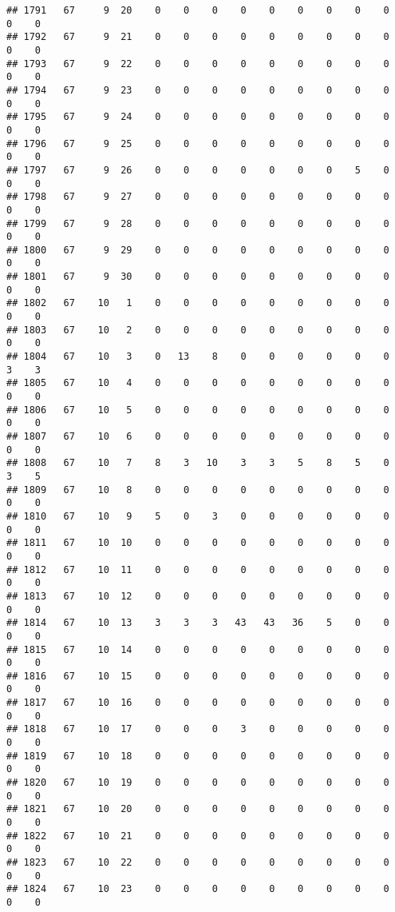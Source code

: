 \documentclass[]{article}
\begin{document}
\begin{verbatim}
## 1791   67     9  20    0    0    0    0    0    0    0    0    0    0    0
## 1792   67     9  21    0    0    0    0    0    0    0    0    0    0    0
## 1793   67     9  22    0    0    0    0    0    0    0    0    0    0    0
## 1794   67     9  23    0    0    0    0    0    0    0    0    0    0    0
## 1795   67     9  24    0    0    0    0    0    0    0    0    0    0    0
## 1796   67     9  25    0    0    0    0    0    0    0    0    0    0    0
## 1797   67     9  26    0    0    0    0    0    0    0    5    0    0    0
## 1798   67     9  27    0    0    0    0    0    0    0    0    0    0    0
## 1799   67     9  28    0    0    0    0    0    0    0    0    0    0    0
## 1800   67     9  29    0    0    0    0    0    0    0    0    0    0    0
## 1801   67     9  30    0    0    0    0    0    0    0    0    0    0    0
## 1802   67    10   1    0    0    0    0    0    0    0    0    0    0    0
## 1803   67    10   2    0    0    0    0    0    0    0    0    0    0    0
## 1804   67    10   3    0   13    8    0    0    0    0    0    0    3    3
## 1805   67    10   4    0    0    0    0    0    0    0    0    0    0    0
## 1806   67    10   5    0    0    0    0    0    0    0    0    0    0    0
## 1807   67    10   6    0    0    0    0    0    0    0    0    0    0    0
## 1808   67    10   7    8    3   10    3    3    5    8    5    0    3    5
## 1809   67    10   8    0    0    0    0    0    0    0    0    0    0    0
## 1810   67    10   9    5    0    3    0    0    0    0    0    0    0    0
## 1811   67    10  10    0    0    0    0    0    0    0    0    0    0    0
## 1812   67    10  11    0    0    0    0    0    0    0    0    0    0    0
## 1813   67    10  12    0    0    0    0    0    0    0    0    0    0    0
## 1814   67    10  13    3    3    3   43   43   36    5    0    0    0    0
## 1815   67    10  14    0    0    0    0    0    0    0    0    0    0    0
## 1816   67    10  15    0    0    0    0    0    0    0    0    0    0    0
## 1817   67    10  16    0    0    0    0    0    0    0    0    0    0    0
## 1818   67    10  17    0    0    0    3    0    0    0    0    0    0    0
## 1819   67    10  18    0    0    0    0    0    0    0    0    0    0    0
## 1820   67    10  19    0    0    0    0    0    0    0    0    0    0    0
## 1821   67    10  20    0    0    0    0    0    0    0    0    0    0    0
## 1822   67    10  21    0    0    0    0    0    0    0    0    0    0    0
## 1823   67    10  22    0    0    0    0    0    0    0    0    0    0    0
## 1824   67    10  23    0    0    0    0    0    0    0    0    0    0    0

\end{verbatim}
\end{document}
